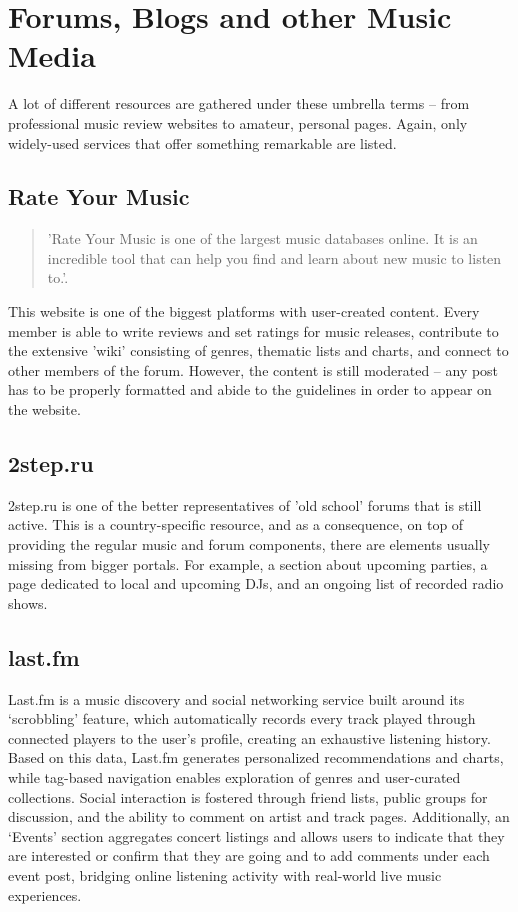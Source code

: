 \section{Forums, Blogs and other Music Media}
A lot of different resources are gathered under these umbrella terms -- from professional music review websites to
amateur, personal pages. Again, only widely-used services that offer something remarkable are listed.

\subsection{Rate Your Music}

\begin{quote}
    'Rate Your Music is one of the largest music databases online. It is an incredible tool that
    can help you find and learn about new music to listen to.'\cite{ryt}.\\
\end{quote}
This website is one of the biggest platforms with user-created content.
Every member is able to write reviews and set ratings for music releases,
contribute to the extensive 'wiki' consisting of genres, thematic lists and charts,
and connect to other members of the forum. However, the content is still moderated -- any post has
to be properly formatted and abide to the guidelines in order to appear on the website.

\subsection{2step.ru}
2step.ru is one of the better representatives of 'old school' forums that is still active.
This is a country-specific resource, and as a consequence,
on top of providing the regular music and forum components, there are elements usually missing
from bigger portals. For example, a section about upcoming parties,
a page dedicated to local and upcoming DJs, and an ongoing list of recorded radio shows.\cite{2step}


\subsection{last.fm}
Last.fm is a music discovery and social networking service built around its ‘scrobbling’ feature,
which automatically records every track played through connected players to the user’s profile,
creating an exhaustive listening history\cite{lastfm}.
Based on this data, Last.fm generates personalized recommendations and charts,
while tag-based navigation enables exploration of genres and user-curated collections\cite{lastfm_tags}.
Social interaction is fostered through friend lists, public groups for discussion, and the ability to comment
on artist and track pages. Additionally, an `Events' section aggregates concert listings and allows users to
indicate that they are interested or confirm that they are going and to add comments under each event post,
bridging online listening activity with real-world live music experiences\cite{lastfm_events}.

